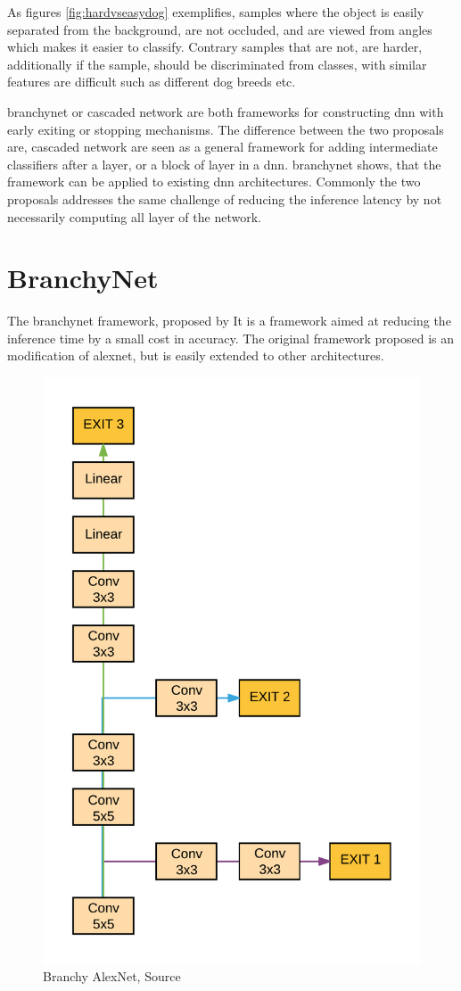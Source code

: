 As figures \ref{fig:hardvseasydog} exemplifies, samples where the object is easily separated from the background, are not occluded, and are viewed from angles which makes it easier to classify. Contrary samples that are not, are harder, additionally if the sample, should be discriminated from classes, with similar features are difficult such as different dog breeds etc.  

\gls{branchynet} \cite{teerapittayanon_branchynet:_2016} or cascaded network \cite{leroux_resource-constrained_2015} are both frameworks for constructing \gls{dnn} with early exiting or stopping mechanisms. The difference between the two proposals are, cascaded network are seen as a general framework for adding intermediate classifiers after a layer, or a block of layer in a \gls{dnn}. \gls{branchynet} shows, that the framework can be applied to existing \gls{dnn} architectures. Commonly the two proposals addresses the same challenge of reducing the inference latency by not necessarily computing all layer of the network.

\section{BranchyNet}

The \gls{branchynet} framework, proposed by \citeauthor{teerapittayanon_branchynet:_2016} It is a framework aimed at reducing the inference time by a small cost in accuracy. The original framework proposed is an modification of \gls{alexnet}, but is easily extended to other architectures. 

\begin{figure}
	\centering
	\includegraphics[width=.3\linewidth]{figures/articles/branchynet}
	\caption[Branchy AlexNet]{Branchy AlexNet, Source  \cite{teerapittayanon_branchynet:_2016}}
\end{figure}

